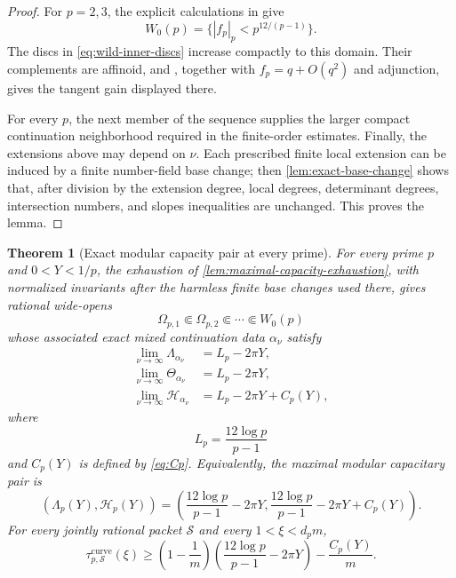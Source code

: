 \documentclass[11pt]{article}
\newtheorem{theorem}{Theorem}[section]
\theoremstyle{definition}
\theoremstyle{remark}
\newcommand{\Energy}{\mathscr H}
\newcommand{\LambdaAH}{\Lambda}
\begin{document}
\begin{proof}
For $p=2,3$, the explicit calculations in
\cite[Lemma~3.1 and the proof of Theorem~3.5]{Calegari2005} give
\[
 W_0(p)=\{|f_p|_p<p^{12/(p-1)}\}.
\]
The discs in \eqref{eq:wild-inner-discs} increase compactly to this domain.
Their complements are affinoid, and
\cite[Corollary~5.8]{BostChambertLoir2009}, together with
$f_p=q+O(q^2)$ and adjunction, gives the tangent gain displayed there.

For every $p$, the next member of the sequence supplies the larger compact
continuation neighborhood required in the finite-order estimates.  Finally,
the extensions above may depend on $\nu$.  Each prescribed finite local
extension can be induced by a finite number-field base change; then
\cref{lem:exact-base-change} shows that, after division by the extension
degree, local degrees, determinant degrees, intersection numbers, and slopes
inequalities are unchanged.  This proves the lemma.
\end{proof}

\begin{theorem}[Exact modular capacity pair at every prime]
\label{thm:allprime-capacity-pair}
For every prime $p$ and $0<Y<1/p$, the exhaustion of
\cref{lem:maximal-capacity-exhaustion}, with normalized invariants after the
harmless finite base changes used there, gives rational wide-opens
\[
 \Omega_{p,1}\Subset\Omega_{p,2}\Subset\cdots\Subset W_0(p)
\]
whose associated exact mixed continuation data $\alpha_\nu$ satisfy
\begin{align}
 \lim_{\nu\to\infty}\LambdaAH_{\alpha_\nu}
 &=L_p-2\pi Y,\label{eq:capacity-pair-Lambda}\\
 \lim_{\nu\to\infty}\Theta_{\alpha_\nu}
 &=L_p-2\pi Y,\label{eq:capacity-pair-Theta}\\
 \lim_{\nu\to\infty}\Energy_{\alpha_\nu}
 &=L_p-2\pi Y+C_p(Y),\label{eq:capacity-pair-Energy}
\end{align}
where
\[
 L_p=\frac{12\log p}{p-1}
\]
and $C_p(Y)$ is defined by \eqref{eq:Cp}.  Equivalently, the maximal modular
capacitary pair is
\begin{equation}\label{eq:capacity-pair-box}
 \boxed{
 (\Lambda_p(Y),\Energy_p(Y))
 =\left(
 \frac{12\log p}{p-1}-2\pi Y,
 \frac{12\log p}{p-1}-2\pi Y+C_p(Y)
 \right).}
\end{equation}
For every jointly rational packet $\mathcal S$ and every $1<\xi<d_pm$,
\begin{equation}\label{eq:allprime-explicit-slopes}
 \boxed{
 \tau^{\mathrm{curve}}_{p,\mathcal S}(\xi)
 \ge
 \left(1-\frac1m\right)
 \left(\frac{12\log p}{p-1}-2\pi Y\right)
 -\frac{C_p(Y)}m.}
\end{equation}
\end{theorem}
\end{document}
